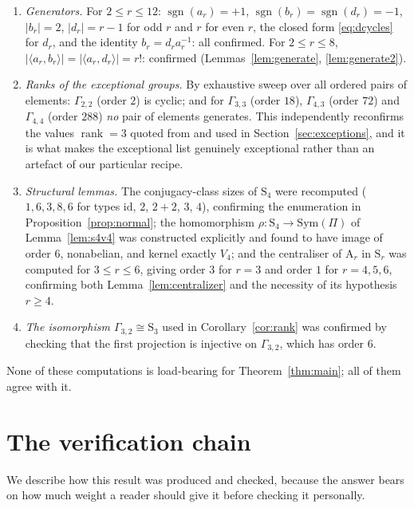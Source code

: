 \documentclass[11pt]{article}
\theoremstyle{plain}
\theoremstyle{definition}
\theoremstyle{remark}
\numberwithin{equation}{section}
\newcommand{\Sym}{\mathrm{S}}
\newcommand{\Alt}{\mathrm{A}}
\newcommand{\Gam}{\Gamma}
\DeclareMathOperator{\sgn}{sgn}
\DeclareMathOperator{\rank}{rank}
\begin{document}
\begin{enumerate}
\item \emph{Generators.} For $2 \le r \le 12$: $\sgn(a_r) = +1$, $\sgn(b_r) = \sgn(d_r) = -1$,
$|b_r| = 2$, $|d_r| = r-1$ for odd $r$ and $r$ for even $r$, the closed form \eqref{eq:dcycles}
for $d_r$, and the identity $b_r = d_ra_r^{-1}$: all confirmed. For $2 \le r \le 8$,
$|\langle a_r,b_r\rangle| = |\langle a_r,d_r\rangle| = r!$: confirmed
(Lemmas~\ref{lem:generate}, \ref{lem:generate2}).

\item \emph{Ranks of the exceptional groups.} By exhaustive sweep over all ordered pairs of
elements: $\Gam_{2,2}$ (order $2$) is cyclic; and for $\Gam_{3,3}$ (order $18$), $\Gam_{4,3}$
(order $72$) and $\Gam_{4,4}$ (order $288$) \emph{no} pair of elements generates. This
independently reconfirms the values $\rank = 3$ quoted from \cite{fernandes} and used in
Section~\ref{sec:exceptions}, and it is what makes the exceptional list genuinely exceptional
rather than an artefact of our particular recipe.

\item \emph{Structural lemmas.} The conjugacy-class sizes of $\Sym_4$ were recomputed
($1,6,3,8,6$ for types $\mathrm{id}$, $2$, $2{+}2$, $3$, $4$), confirming the enumeration in
Proposition~\ref{prop:normal}; the homomorphism $\rho:\Sym_4\to\mathrm{Sym}(\Pi)$ of
Lemma~\ref{lem:s4v4} was constructed explicitly and found to have image of order $6$, nonabelian,
and kernel exactly $V_4$; and the centraliser of $\Alt_r$ in $\Sym_r$ was computed for
$3 \le r \le 6$, giving order $3$ for $r = 3$ and order $1$ for $r = 4,5,6$, confirming both
Lemma~\ref{lem:centralizer} and the necessity of its hypothesis $r \ge 4$.

\item \emph{The isomorphism $\Gam_{3,2}\cong\Sym_3$} used in Corollary~\ref{cor:rank} was
confirmed by checking that the first projection is injective on $\Gam_{3,2}$, which has order
$6$.
\end{enumerate}

None of these computations is load-bearing for Theorem~\ref{thm:main}; all of them agree with
it.

\section{The verification chain}
\label{sec:chain}

We describe how this result was produced and checked, because the answer bears on how much
weight a reader should give it before checking it personally.
\end{document}
